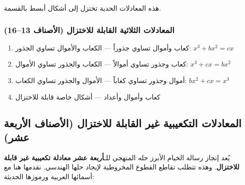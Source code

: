 \documentclass[11pt,a4paper]{book}
\newcommand{\ar}[1]{\leavevmode\arabicfont\beginR #1\endR}
\begin{document}
\ar{هذه المعادلات الحدية تختزل إلى أشكال أبسط بالقسمة.}

\subsubsection{\ar{المعادلات الثلاثية القابلة للاختزال (الأصناف 13--16)}}

\begin{enumerate}[label=\arabic*.,resume,noitemsep]
\item \ar{كعاب وأموال تساوي جذوراً} --- \ar{الكعاب والأموال تساوي الجذور}: $x^3 + bx^2 = cx$
\item \ar{كعاب وجذور تساوي أموالاً} --- \ar{الكعاب والجذور تساوي الأموال}: $x^3 + cx = bx^2$
\item \ar{أموال وجذور تساوي كعاباً} --- \ar{الأموال والجذور تساوي الكعاب}: $bx^2 + cx = x^3$
\item \ar{كعاب وأموال وأعداد} --- \ar{أشكال خاصة قابلة للاختزال}
\end{enumerate}

\clearpage

\subsection{\ar{المعادلات التكعيبية غير القابلة للاختزال (الأصناف الأربعة عشر)}}

\ar{يُعد إنجاز رسالة الخيام الأبرز حله المنهجي للـ\textbf{أربعة عشر معادلة تكعيبية غير قابلة للاختزال}. وهذه تتطلب تقاطع القطوع المخروطية لإيجاد حلها الهندسي. نقدمها هنا مع أسمائها العربية ورموزها الحديثة:}
\end{document}
